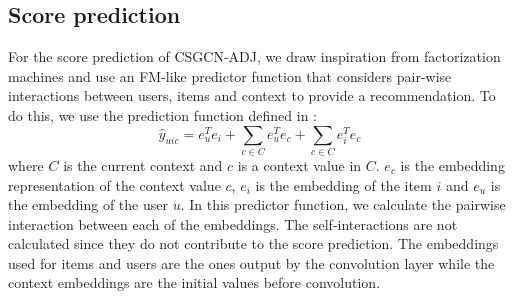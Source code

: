 \subsection{Score prediction}\label{subsec:csgcn_adj_score_pred}
For the score prediction of CSGCN-ADJ, we draw inspiration from factorization machines and use an FM-like predictor function that considers pair-wise interactions between users, items and context to provide a recommendation.
To do this, we use the prediction function defined in :
\begin{equation}\label{eq:csgcn_adj_scorepred}
    \hat{y}_{uic} = e_u^Te_i + \sum_{c \in C}e_u^Te_{c} + \sum_{c \in C}e_i^Te_{c}
\end{equation}
where $C$ is the current context and $c$ is a context value in $C$.
$e_{c}$ is the embedding representation of the context value $c$, $e_i$ is the embedding of the item $i$ and $e_u$ is the embedding of the user $u$.
In this predictor function, we calculate the pairwise interaction between each of the embeddings. The self-interactions are not calculated since they do not contribute to the score prediction. The embeddings used for items and users are the ones output by the convolution layer while the context embeddings are the initial values before convolution.


